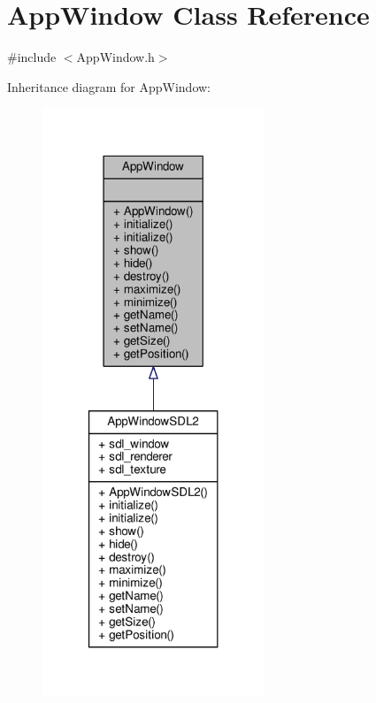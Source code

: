 \hypertarget{classAppWindow}{\section{App\-Window Class Reference}
\label{classAppWindow}
}


{\ttfamily \#include $<$App\-Window.\-h$>$}



Inheritance diagram for App\-Window\-:
\nopagebreak
\begin{figure}[H]
\begin{center}
\leavevmode
\includegraphics[width=188pt]{classAppWindow__inherit__graph}
\end{center}
\end{figure}


